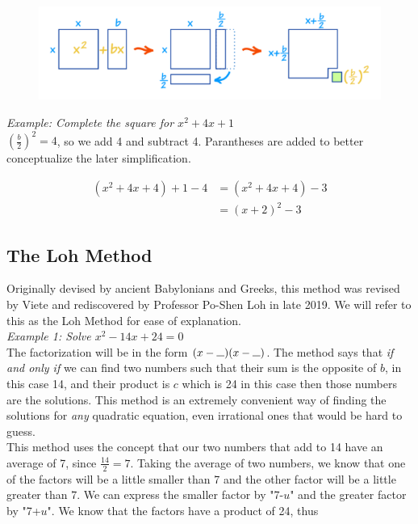         \begin{figure} [hbt!]
            \centering
            \includegraphics [scale = 0.4] {Resources/Unit2Quadratics/Completing_The_Square.png}
        \end{figure}

        \noindent \color{blue} \textit{Example: Complete the square for $x^2+4x+1$} \color{black} \\
        $\left(\frac{b}{2}\right)^2 = 4$, so we add 4 and subtract 4. Parantheses are added to
        better conceptualize the later simplification.

        \begin{align*}
            (x^2+4x+4)+1-4 &= (x^2+4x+4) - 3 \\
            &= (x+2)^2 - 3
        \end{align*}



    \subsection{The Loh Method}
        Originally devised by ancient Babylonians and Greeks, this method was revised by Viete
        and rediscovered by Professor Po-Shen Loh in late 2019. We will refer to this as the
        Loh Method for ease of explanation. \\

        \noindent \color{blue} \textit{Example 1: Solve $x^2-14x+24=0$} \color{black} \\
        The factorization will be in the form $(x-\longunderscore)(x-\longunderscore)$.
        The method says that \textit{if and only if} we can find two numbers such that their sum
        is the opposite of $b$, in this case 14, and their product is $c$ which is 24 in this case
        then those numbers are the solutions. This method is an extremely convenient way of finding
        the solutions for \textit{any} quadratic equation, even irrational ones that would be hard
        to guess. \\

        \noindent This method uses the concept that our two numbers that add to 14 have an average
        of 7, since $\frac{14}{2} = 7$. Taking the average of two numbers, we know that one of the
        factors will be a little smaller than 7 and the other factor will be a little greater than
        7. We can express the smaller factor by "7-$u$" and the greater factor by "7+$u$". We know
        that the factors have a product of 24, thus

